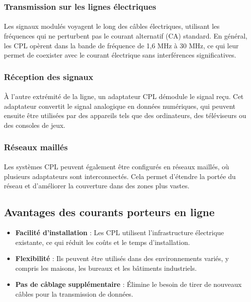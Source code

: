\documentclass[a4paper,twocolumn]{report}
\begin{document}
\subsubsection{Transmission sur les lignes électriques}
\paragraph{} Les signaux modulés voyagent le long des câbles électriques, utilisant les fréquences qui ne perturbent pas le courant alternatif (CA) standard. En général, les CPL opèrent dans la bande de fréquence de 1,6 MHz à 30 MHz, ce qui leur permet de coexister avec le courant électrique sans interférences significatives.

\subsubsection{Réception des signaux}
\paragraph{} À l'autre extrémité de la ligne, un adaptateur CPL démodule le signal reçu. Cet adaptateur convertit le signal analogique en données numériques, qui peuvent ensuite être utilisées par des appareils tels que des ordinateurs, des téléviseurs ou des consoles de jeux.

\subsubsection{Réseaux maillés}
\paragraph{} Les systèmes CPL peuvent également être configurés en réseaux maillés, où plusieurs adaptateurs sont interconnectés. Cela permet d'étendre la portée du réseau et d'améliorer la couverture dans des zones plus vastes.

\subsection{Avantages des courants porteurs en ligne}
\begin{itemize}
    \item \textbf{Facilité d'installation} : Les CPL utilisent l'infrastructure électrique existante, ce qui réduit les coûts et le temps d'installation.
    \item \textbf{Flexibilité} : Ils peuvent être utilisés dans des environnements variés, y compris les maisons, les bureaux et les bâtiments industriels.
    \item \textbf{Pas de câblage supplémentaire} : Élimine le besoin de tirer de nouveaux câbles pour la transmission de données.
\end{itemize}
\end{document}
